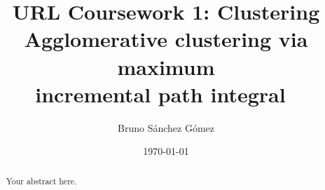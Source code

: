 \documentclass[a4paper,10pt,twocolumn]{article}
\title{URL Coursework 1: Clustering \\ \Large{Agglomerative clustering via maximum \\ incremental path integral~\cite{PIC}}}
\author{Bruno Sánchez Gómez}
\date{\today}
\begin{document}
\maketitle

\begin{abstract}
Your abstract here.
\end{abstract}











\end{document}

